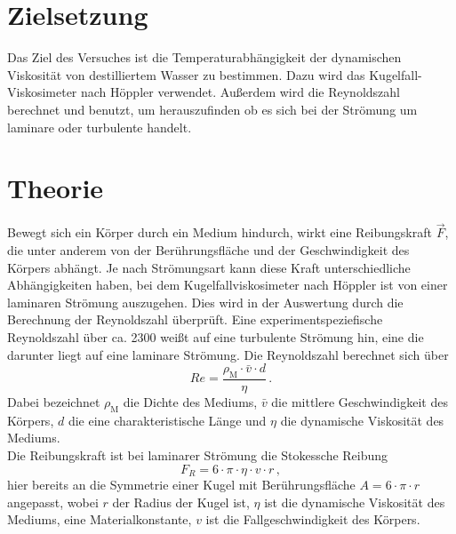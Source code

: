 \section{Zielsetzung}
\label{sec:Zielsetzung}
Das Ziel des Versuches ist die Temperaturabhängigkeit der dynamischen 
Viskosität von destilliertem Wasser zu bestimmen. Dazu wird das Kugelfall-
Viskosimeter nach Höppler verwendet. Außerdem wird die Reynoldszahl 
berechnet und benutzt, um herauszufinden ob es sich bei der Strömung um 
laminare oder turbulente handelt. 
%
%
%
\section{Theorie}
\label{sec:Theorie}
Bewegt sich ein Körper durch ein Medium hindurch, wirkt eine Reibungskraft 
$\vec{F}$, die unter anderem von der Berührungsfläche und der Geschwindigkeit
des Körpers abhängt. Je nach Strömungsart kann diese Kraft 
unterschiedliche Abhängigkeiten haben, bei dem Kugelfallviskosimeter nach 
Höppler ist von einer laminaren Strömung auszugehen. 
Dies wird in der Auswertung durch die
Berechnung der Reynoldszahl überprüft. Eine experimentspeziefische 
Reynoldszahl über ca. 2300 weißt auf eine turbulente Strömung hin, eine die
darunter liegt auf eine laminare Strömung. Die Reynoldszahl berechnet sich
über 
\begin{equation}
    Re = \frac{\rho_{\text{M}} \cdot \bar{v} \cdot d}{\eta}\,. 
    \label{equ:Reynoldszahl}
\end{equation}
Dabei bezeichnet $\rho_{\text{M}}$ die Dichte des Mediums, $\bar{v}$
die mittlere Geschwindigkeit des Körpers, $d$ die eine charakteristische 
Länge und $\eta$ die dynamische Viskosität des Mediums. \\
Die Reibungskraft ist bei laminarer Strömung die Stokessche Reibung
\begin{equation}
    F_{R} = 6 \cdot \pi \cdot \eta \cdot v \cdot r \, , 
    \label{equ:Stokesreibungskraft}
\end{equation}
hier bereits an die Symmetrie einer Kugel mit Berührungsfläche 
$A = 6 \cdot \pi \cdot r$ angepasst, wobei $r$ der Radius der Kugel ist, 
$\eta$ ist die dynamische Viskosität des Mediums, eine Materialkonstante,
$v$ ist die Fallgeschwindigkeit des Körpers. 
%
